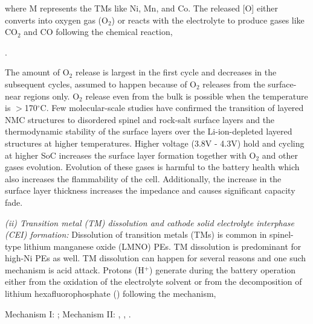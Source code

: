 \documentclass[aps,prb,twocolumn,superscriptaddress,reprint]{revtex4-1}
\begin{document}
where M represents the TMs like Ni, Mn, and Co. The released [O] either converts into oxygen gas (O$_2$) or reacts with the electrolyte to produce gases like CO$_2$ and CO following the chemical reaction, \cite{jung2017oxygen, jung2017chemical}

\begin{center}
    .
\end{center}

The amount of O$_2$ release is largest in the first cycle and decreases in the subsequent cycles, assumed to happen because of O$_2$ releases from the surface-near regions only. \cite{jung2017oxygen} O$_2$ release even from the bulk is possible when the temperature is $>$170$^{\circ}$C. \cite{konishi2011thermal,arai1998thermal,belharouak2006thermal} Few molecular-scale studies have confirmed the transition of layered NMC structures to disordered spinel and rock-salt surface layers and the thermodynamic stability of the surface layers over the Li-ion-depleted layered structures at higher temperatures. \cite{radin2017narrowing} Higher voltage (3.8V - 4.3V) hold and cycling at higher SoC increases the surface layer formation together with O$_2$ and other gases evolution. Evolution of these gases is harmful to the battery health which also increases the flammability of the cell. Additionally, the increase in the surface layer thickness increases the impedance and causes significant capacity fade. \cite{jung2017oxygen,jung2017chemical,jung2018temperature,lin2014surface}

\textit{(ii) Transition metal (TM) dissolution and cathode solid electrolyte interphase (CEI) formation:} Dissolution of transition metals (TMs) is common in spinel-type lithium manganese oxide (LMNO) PEs. TM dissolution is predominant for high-Ni PEs as well. TM dissolution can happen for several reasons and one such mechanism is acid attack. Protons (H$^+$) generate during the battery operation either from the oxidation of the electrolyte solvent or from the decomposition of lithium hexafluorophosphate () following the mechanism, \cite{vetter2005ageing,li2018temperature}

\begin{center}
    Mechanism I: ; \newline
    Mechanism II: , , .
\end{center}
\end{document}

